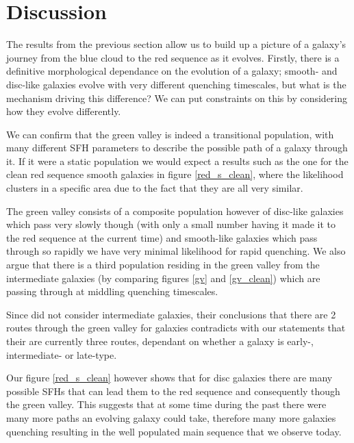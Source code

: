 \documentclass{mn2e}
\begin{document}
\section{Discussion}\label{diss}
The results from the previous section allow us to build up a picture of a galaxy's journey from the blue cloud to the red sequence as it evolves. Firstly, there is a definitive morphological dependance on the evolution of a galaxy; smooth- and disc-like galaxies evolve with very different quenching timescales, but what is the mechanism driving this difference? We can put constraints on this by considering how they evolve differently.

We can confirm that the green valley is indeed a transitional population, with many different SFH parameters to describe the possible path of a galaxy through it. If it were a static population we would expect a results such as the one for the clean red sequence smooth galaxies in figure \ref{red_s_clean}, where the likelihood clusters in a specific area due to the fact that they are all very similar. 

The green valley consists of a composite population however of disc-like galaxies which pass very slowly though (with only a small number having it made it to the red sequence at the current time) and smooth-like galaxies which pass through so rapidly we have very minimal likelihood for rapid quenching. We also argue that there is a third population residing in the green valley from the intermediate galaxies (by comparing figures \ref{gv} and \ref{gv_clean}) which are passing through at middling quenching timescales. 

Since \citet{Sch2014} did not consider intermediate galaxies, their conclusions that there are 2 routes through the green valley for galaxies contradicts with our statements that their are currently three routes, dependant on whether a galaxy is early-, intermediate- or late-type. 

Our figure \ref{red_s_clean} however shows that for disc galaxies there are many possible SFHs that can lead them to the red sequence and consequently though the green valley. This suggests that at some time during the past there were many more paths an evolving galaxy could take, therefore many more galaxies quenching resulting in the well populated main sequence that we observe today. 
\end{document}
